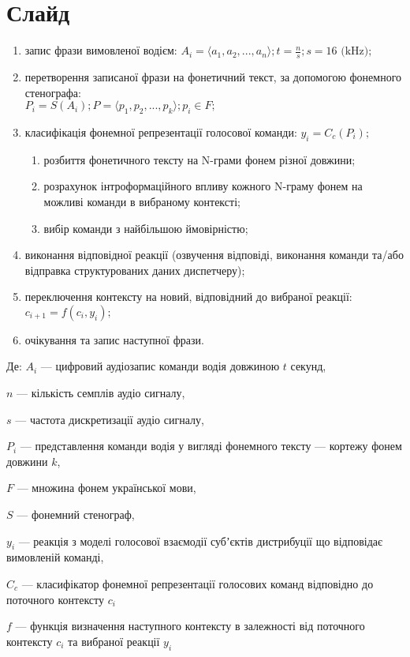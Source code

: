 \chapter{Слайд}
\setlength{\leftskip}{-3em}\cyrillicfontsf

\begin{enumerate}
	\setlength{\leftskip}{-3em}\cyrillicfontsf
	\item запис фрази вимовленої водієм: $A_i=\langle a_1,a_2,...,a_n\rangle; t=\frac{n}{s}; s=16 \text{ (kHz)};$
	\item перетворення записаної фрази на фонетичний текст, за допомогою фонемного стенографа: \\ $P_i=S(A_i); P=\langle p_1,p_2,...,p_k\rangle; p_i \in F;$
	\item класифікація фонемної репрезентації голосової команди: $y_i=C_c(P_i);$
	\begin{enumerate}
		\item розбиття фонетичного тексту на N-грами фонем різної довжини;
		\item розрахунок інтроформаційного впливу кожного N-граму фонем на можливі команди в вибраному контексті;
		\item вибір команди з найбільшою ймовірністю;
	\end{enumerate}
	\item виконання відповідної реакції (озвучення відповіді, виконання команди та/або відправка структурованих даних диспетчеру);
	\item переключення контексту на новий, відповідний до вибраної реакції: $c_{i+1} = f(c_i, y_i);$
	\item очікування та запис наступної фрази.
\end{enumerate}


Де: $A_i$ --- цифровий аудіозапис команди водія довжиною $t$ секунд,

{\settowidth{\leftskip}{Де:\ }
	
	$n$ --- кількість семплів аудіо сигналу,
	
	$s$ --- частота дискретизації аудіо сигналу,
	
	$P_i$ --- представлення команди водія у вигляді фонемного тексту --- кортежу фонем довжини $k$,
	
	$F$ --- множина фонем української мови,
	
	$S$ --- фонемний стенограф,
	
	$y_i$ --- реакція з моделі голосової взаємодії субʼєктів дистрибуції що відповідає вимовленій команді,
	
	$C_c$ --- класифікатор фонемної репрезентації голосових команд відповідно до поточного контексту $c_i$
	
	$f$ --- функція визначення наступного контексту в залежності від поточного контексту $c_i$ та вибраної реакції $y_i$
	
}


